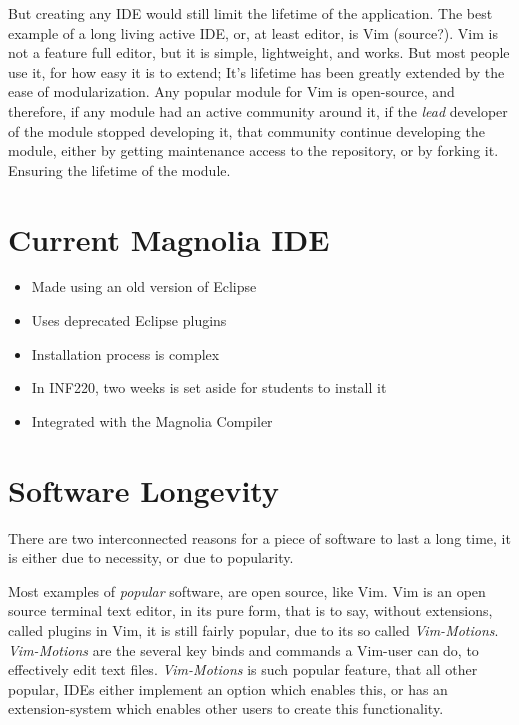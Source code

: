 But creating any IDE would still limit the lifetime of the application. The best
example of a long living active IDE, or, at least editor, is Vim (source?). Vim
is not a feature full editor, but it is simple, lightweight, and works. But most
people use it, for how easy it is to extend; It's lifetime has been greatly
extended by the ease of modularization. Any popular module for Vim is
open-source, and therefore, if any module had an active community around it, if
the \textit{lead} developer of the module stopped developing it, that community
continue developing the module, either by getting maintenance access to the
repository, or by forking it. Ensuring the lifetime of the module.

\section{Current Magnolia IDE}

\begin{itemize}
  \item Made using an old version of Eclipse
  \item Uses deprecated Eclipse plugins
  \item Installation process is complex
  \item In INF220, two weeks is set aside for students to install it
  \item Integrated with the Magnolia Compiler
\end{itemize}


\section{Software Longevity}

There are two interconnected reasons for a piece of software to last a long
time, it is either due to necessity, or due to popularity.


Most examples of \textit{popular} software, are open source, like Vim. Vim is an
open source terminal text editor, in its pure form, that is to say, without
extensions, called plugins in Vim, it is still fairly popular, due to its so
called \textit{Vim-Motions}. \textit{Vim-Motions} are the several key binds and
commands a Vim-user can do, to effectively edit text files. \textit{Vim-Motions}
is such popular feature, that all other popular, IDEs either implement an option
which enables this, or has an extension-system which enables other users to
create this functionality.
